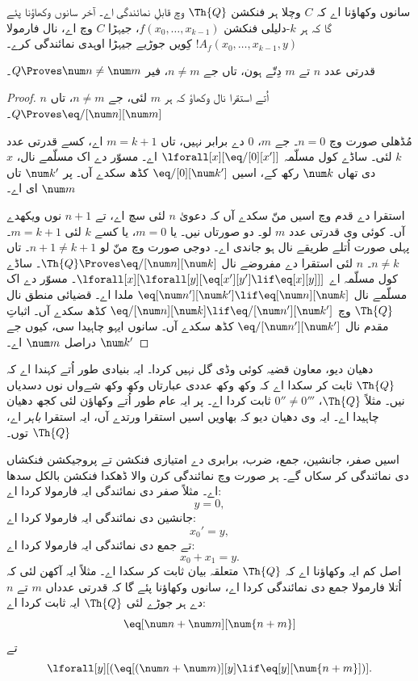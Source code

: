 \documentclass[../../../include/open-logic-section]{subfiles}
\begin{document}

سانوں وکھاؤنا اے کہ $C$ وچلا ہر فنکشن $\Th{Q}$ وچ قابلِ نمائندگی اے۔ آخر سانوں وکھاؤنا پئے گا کہ ہر $k$-دلیلی فنکشن $f(x_0,\dots,x_{k-1})$، جیہڑا $C$ وچ اے، نال فارمولا $!A_f(x_0,\dots,x_{k-1},y)$ کِویں جوڑیے جیہڑا اوہدی نمائندگی کرے۔

\begin{lem}
قدرتی عدد $n$ تے $m$ دِتّے ہون، تاں جے $n \neq m$، فیر $Q \Proves \num
n \neq \num m$۔
\end{lem}

\begin{proof}
$n$ اُتے استقرا نال وکھاؤ کہ ہر $m$ لئی، جے $n \neq m$، تاں
$Q \Proves \eq/[\num n][\num m]$۔

مُڈھلی صورت وچ $n = 0$۔ جے $m$، $0$ دے برابر نہیں، تاں $m = k +
1$ اے، کسے قدرتی عدد $k$ لئی۔ ساڈے کول مسلّمہ $\lforall[x][\eq/[0][x']]$ اے۔ مسوّر دے اک مسلّمے نال، $x$ دی تھاں $\num k$ رکھ کے، اسیں $\eq/[0][\num k']$ کڈھ سکدے آں۔ پر $\num k'$ تاں $\num m$ ای اے۔

استقرا دے قدم وچ اسیں منّ سکدے آں کہ دعویٰ $n$ لئی سچ اے، تے $n+1$ نوں ویکھدے آں۔ کوئی وی قدرتی عدد $m$ لو۔ دو صورتاں نیں۔ یا $m = 0$، یا کسے $k$ لئی $m = k+1$۔ پہلی صورت اُتلے طریقے نال ہو جاندی اے۔ دوجی صورت وچ منّ لو $n+1 \neq
k+1$۔ تاں $n \neq k$۔ $n$ لئی استقرا دے مفروضے نال
$\Th{Q} \Proves \eq/[\num n][\num k]$۔ ساڈے کول مسلّمہ اے
$\lforall[x][\lforall[y][\eq[x'][y'] \lif \eq[x][y]]]$۔ مسوّر دے اک مسلّمے نال $\eq[\num n'][\num k'] \lif \eq[\num n][\num
  k]$ ملدا اے۔ قضیائی منطق نال $\Th{Q}$ وچ
$\eq/[\num n][\num k] \lif \eq/[\num n'][\num k']$ کڈھ سکدے آں۔ اثباتِ مقدم نال $\eq/[\num n'][\num k']$ کڈھ سکدے آں۔ سانوں ایہو چاہیدا سی، کیوں جے $\num k'$ دراصل $\num m$ اے۔
\end{proof}

دھیان دیو، معاون قضیہ کوئی وڈی گل نہیں کردا۔ ایہ بنیادی طور اُتے کہندا اے کہ $\Th{Q}$ ثابت کر سکدا اے کہ وکھ وکھ عددی عبارتاں وکھ وکھ شےواں نوں دسدیاں نیں۔ مثلاً $\Th{Q}$، $0'' \neq 0'''$ ثابت کردا اے۔ پر ایہ عام طور اُتے وکھاؤن لئی کجھ دھیان چاہیدا اے۔ ایہ وی دھیان دیو کہ بھاویں اسیں استقرا ورتدے آں، ایہ استقرا \emph{باہر} اے، $\Th{Q}$ توں۔

اسیں صفر، جانشین، جمع، ضرب، برابری دے امتیازی فنکشن تے پروجیکشن فنکشاں دی نمائندگی کر سکاں گے۔ ہر صورت وچ نمائندگی کرن والا ڈھکدا فنکشن بالکل سدھا اے۔ مثلاً صفر دی نمائندگی ایہ فارمولا کردا اے:
\[
y = 0,
\]
جانشین دی نمائندگی ایہ فارمولا کردا اے:
\[
x_0' = y,
\]
تے جمع دی نمائندگی ایہ فارمولا کردا اے:
\[
x_0 + x_1 = y.
\]
اصل کم ایہ وکھاؤنا اے کہ $\Th{Q}$ متعلقہ بیان ثابت کر سکدا اے۔ مثلاً ایہ آکھن لئی کہ اُتلا فارمولا جمع دی نمائندگی کردا اے، سانوں وکھاؤنا پئے گا کہ قدرتی عدداں $m$ تے $n$ دے ہر جوڑے لئی $\Th{Q}$ ایہ ثابت کردا اے:
\[
\eq[\num n + \num m][\num {n+m}]
\]
تے
\[
\lforall[y][(\eq[(\num n + \num m)][y] \lif \eq[y][\num {n+m}])].
\]
\end{document}
